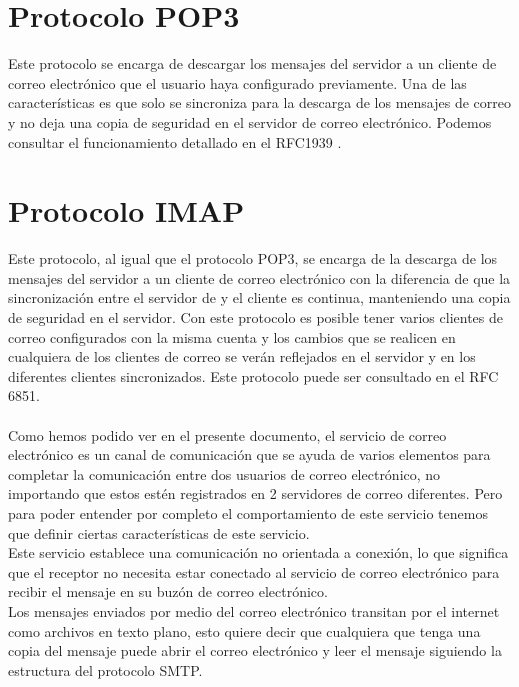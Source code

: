 \documentclass[12pt,oneside,onecolumn,openany]{report}
\begin{document}
\section{Protocolo POP3}
Este protocolo se encarga de descargar los mensajes del servidor a un cliente de correo electrónico  que  el  usuario  haya  configurado  previamente.  Una  de  las  características  es 
que  solo se sincroniza para  la descarga de  los  mensajes de  correo y  no deja una copia de seguridad en el servidor de correo electrónico. Podemos consultar el funcionamiento detallado en el RFC1939 \cite{1939}.
\section{Protocolo IMAP}
Este  protocolo,  al  igual  que  el  protocolo  POP3,  se  encarga  de  la descarga  de  los mensajes  del  servidor  a  un  cliente  de  correo  electrónico  con  la  diferencia  de  que  la 
sincronización  entre  el  servidor  de y  el  cliente   es continua,  manteniendo  una  copia  de  seguridad  en  el  servidor.  Con  este  protocolo  es 
posible tener varios clientes de correo configurados con la misma  cuenta y los cambios que se realicen en cualquiera de los clientes de correo se verán reflejados en el servidor 
y  en  los  diferentes  clientes  sincronizados.  Este  protocolo  puede  ser  consultado  en  el RFC 6851\cite{6851}.\\ \\
Como hemos podido ver en el presente documento, el servicio de correo electrónico es un  canal  de  comunicación  que  se  ayuda  de  varios  elementos  para  completar  la 
comunicación  entre  dos  usuarios  de  correo  electrónico,  no  importando  que  estos  estén registrados en 2 servidores de correo diferentes. Pero 
para poder entender por completo el  comportamiento  de  este  servicio  tenemos  que  definir  ciertas  características  de  este servicio. 
\\
Este servicio establece una comunicación no orientada a conexión, lo que significa que el  receptor  no  necesita  estar  conectado  al  servicio  de  correo  electrónico  para  recibir  el mensaje en su buzón de correo electrónico. 
\\
Los mensajes enviados por medio del correo electrónico transitan por el   internet   como archivos  en  texto  plano,  esto  quiere  decir  que  cualquiera  que  tenga  una  copia  del 
mensaje puede abrir el correo            electrónico    y    leer    el    mensaje    siguiendo    la estructura del protocolo SMTP. 
\end{document}
